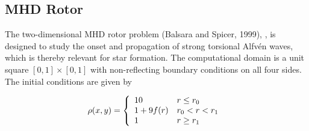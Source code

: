 \subsection{MHD Rotor}
\label{Sec:SimulationRotor}
The two-dimensional MHD rotor problem (Balsara and Spicer, 1999),
, is designed to study the
onset and propagation of strong torsional Alfv\'{e}n waves, which is thereby
relevant for star formation. The computational domain is a unit square
$[0,1]\times[0,1]$ with non-reflecting boundary conditions on all four sides.
The initial conditions are given by

\begin{equation}
\rho(x,y)=\left\{ \begin{array}{l@{\quad}l}
            10       & r \leq r_0 \\
                    1+9f(r)  & r_0 < r < r_1\\
                    1        & r \geq r_1
              \end{array} \right.\,
\end{equation}

